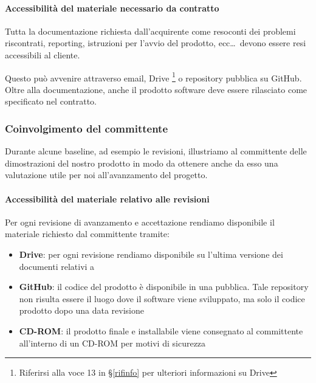         \paragraph{Accessibilità del materiale necessario da contratto} \label{AccessibilitaMateriale}
        Tutta la documentazione richiesta dall'acquirente come resoconti dei problemi riscontrati,  reporting, istruzioni per l'avvio del prodotto, ecc\dots\ devono essere resi accessibili al cliente. \par
        Questo può avvenire attraverso email, Drive \footnote{Riferirsi alla voce 13 in \S\ref{rifinfo} per ulteriori informazioni su Drive} o repository pubblica su GitHub.
        Oltre alla documentazione, anche il prodotto software deve essere rilasciato come specificato nel contratto.
        
        \subsubsection{Coinvolgimento del committente} \label{CoinvolgimentoCommittente}
        Durante alcune baseline, ad esempio le revisioni,
        illustriamo al committente delle dimostrazioni del nostro prodotto in modo da ottenere anche da esso una valutazione utile per noi all'avanzamento del progetto.
        
        \paragraph{Accessibilità del materiale relativo alle revisioni} \label{AccessibilitaMaterialeRevisioni}
        Per ogni revisione di avanzamento e accettazione rendiamo disponibile il materiale richiesto dal committente tramite:
        \begin{itemize}
            \item \textbf{Drive}: per ogni revisione rendiamo disponibile su  l'ultima versione dei documenti relativi a \progetto
            \item \textbf{GitHub}: il codice del prodotto è disponibile in una  pubblica. Tale repository non risulta essere il luogo dove il software viene sviluppato, ma solo il codice prodotto dopo una data revisione
            \item \textbf{CD-ROM}: il prodotto finale e  installabile viene consegnato al committente all'interno di un CD-ROM per motivi di sicurezza
        \end{itemize}

